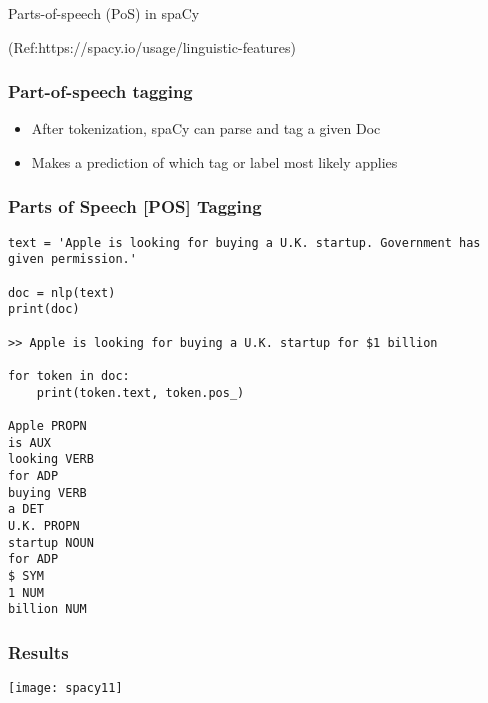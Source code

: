 \begin{frame}[fragile]\frametitle{}

\begin{center}
{\Large Parts-of-speech (PoS) in spaCy}

{\tiny (Ref:https://spacy.io/usage/linguistic-features)}

\end{center}


\end{frame}

\begin{frame}[fragile]\frametitle{Part-of-speech tagging}
  \begin{itemize}
    \item After tokenization, spaCy can parse and tag a given Doc
		\item Makes a prediction of which tag or label most likely applies
  \end{itemize}
	
\end{frame}

\begin{frame}[fragile]\frametitle{Parts of Speech [POS] Tagging }

\begin{lstlisting}
text = 'Apple is looking for buying a U.K. startup. Government has given permission.'

doc = nlp(text)
print(doc)

>> Apple is looking for buying a U.K. startup for $1 billion

for token in doc:
    print(token.text, token.pos_)

Apple PROPN
is AUX
looking VERB
for ADP
buying VERB
a DET
U.K. PROPN
startup NOUN
for ADP
$ SYM
1 NUM
billion NUM
\end{lstlisting}
	
\end{frame}

\begin{frame}[fragile]\frametitle{Results}
	
\begin{center}
\texttt{[image: spacy11]}
\end{center}

\end{frame}

